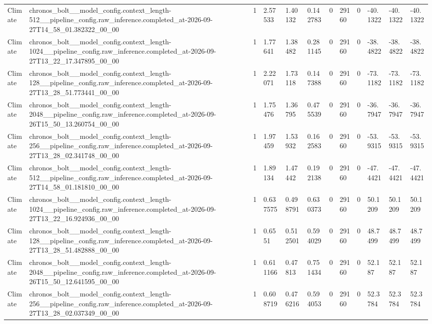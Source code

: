 \begin{tabular}{llllllllllll}
Climate & chronos\_bolt\_\_model\_config.context\_length-512\_\_pipeline\_config.raw\_inference.completed\_at-2026-09-27T14\_58\_01.382322\_00\_00 & 1 & 2.57533 & 1.40132 & 0.142783 & 0 & 29160 & 0 & -40.1322 & -40.1322 & -40.1322 \\
Climate & chronos\_bolt\_\_model\_config.context\_length-1024\_\_pipeline\_config.raw\_inference.completed\_at-2026-09-27T13\_22\_17.347895\_00\_00 & 1 & 1.77641 & 1.38482 & 0.281145 & 0 & 29160 & 0 & -38.4822 & -38.4822 & -38.4822 \\
Climate & chronos\_bolt\_\_model\_config.context\_length-128\_\_pipeline\_config.raw\_inference.completed\_at-2026-09-27T13\_28\_51.773441\_00\_00 & 1 & 2.22071 & 1.73118 & 0.147388 & 0 & 29160 & 0 & -73.1182 & -73.1182 & -73.1182 \\
Climate & chronos\_bolt\_\_model\_config.context\_length-2048\_\_pipeline\_config.raw\_inference.completed\_at-2026-09-26T15\_50\_13.260754\_00\_00 & 1 & 1.75476 & 1.36795 & 0.475539 & 0 & 29160 & 0 & -36.7947 & -36.7947 & -36.7947 \\
Climate & chronos\_bolt\_\_model\_config.context\_length-256\_\_pipeline\_config.raw\_inference.completed\_at-2026-09-27T13\_28\_02.341748\_00\_00 & 1 & 1.97459 & 1.53932 & 0.162583 & 0 & 29160 & 0 & -53.9315 & -53.9315 & -53.9315 \\
Climate & chronos\_bolt\_\_model\_config.context\_length-512\_\_pipeline\_config.raw\_inference.completed\_at-2026-09-27T14\_58\_01.181810\_00\_00 & 1 & 1.89134 & 1.47442 & 0.192138 & 0 & 29160 & 0 & -47.4421 & -47.4421 & -47.4421 \\
Climate & chronos\_bolt\_\_model\_config.context\_length-1024\_\_pipeline\_config.raw\_inference.completed\_at-2026-09-27T13\_22\_16.924936\_00\_00 & 1 & 0.637575 & 0.498791 & 0.630373 & 0 & 29160 & 0 & 50.1209 & 50.1209 & 50.1209 \\
Climate & chronos\_bolt\_\_model\_config.context\_length-128\_\_pipeline\_config.raw\_inference.completed\_at-2026-09-27T13\_28\_51.482888\_00\_00 & 1 & 0.6551 & 0.512501 & 0.594029 & 0 & 29160 & 0 & 48.7499 & 48.7499 & 48.7499 \\
Climate & chronos\_bolt\_\_model\_config.context\_length-2048\_\_pipeline\_config.raw\_inference.completed\_at-2026-09-26T15\_50\_12.641595\_00\_00 & 1 & 0.611166 & 0.47813 & 0.751434 & 0 & 29160 & 0 & 52.187 & 52.187 & 52.187 \\
Climate & chronos\_bolt\_\_model\_config.context\_length-256\_\_pipeline\_config.raw\_inference.completed\_at-2026-09-27T13\_28\_02.037349\_00\_00 & 1 & 0.608719 & 0.476216 & 0.594053 & 0 & 29160 & 0 & 52.3784 & 52.3784 & 52.3784 \\

\end{tabular}
